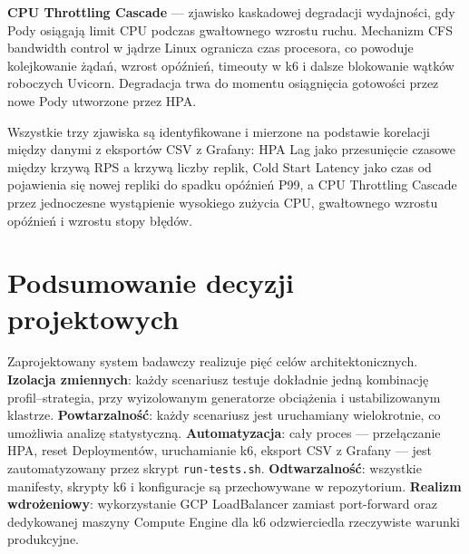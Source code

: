 \textbf{CPU Throttling Cascade} --- zjawisko kaskadowej degradacji wydajności, gdy Pody osiągają limit CPU podczas gwałtownego wzrostu ruchu. Mechanizm CFS bandwidth control w jądrze Linux ogranicza czas procesora, co powoduje kolejkowanie żądań, wzrost opóźnień, timeouty w k6 i dalsze blokowanie wątków roboczych Uvicorn. Degradacja trwa do momentu osiągnięcia gotowości przez nowe Pody utworzone przez HPA.

Wszystkie trzy zjawiska są identyfikowane i mierzone na podstawie korelacji między danymi z eksportów CSV z Grafany: HPA Lag jako przesunięcie czasowe między krzywą RPS a krzywą liczby replik, Cold Start Latency jako czas od pojawienia się nowej repliki do spadku opóźnień P99, a CPU Throttling Cascade przez jednoczesne wystąpienie wysokiego zużycia CPU, gwałtownego wzrostu opóźnień i wzrostu stopy błędów.

\section{Podsumowanie decyzji projektowych}

Zaprojektowany system badawczy realizuje pięć celów architektonicznych. \textbf{Izolacja zmiennych}: każdy scenariusz testuje dokładnie jedną kombinację profil--strategia, przy wyizolowanym generatorze obciążenia i ustabilizowanym klastrze. \textbf{Powtarzalność}: każdy scenariusz jest uruchamiany wielokrotnie, co umożliwia analizę statystyczną. \textbf{Automatyzacja}: cały proces --- przełączanie HPA, reset Deploymentów, uruchamianie k6, eksport CSV z Grafany --- jest zautomatyzowany przez skrypt \texttt{run-tests.sh}. \textbf{Odtwarzalność}: wszystkie manifesty, skrypty k6 i konfiguracje są przechowywane w repozytorium. \textbf{Realizm wdrożeniowy}: wykorzystanie GCP LoadBalancer zamiast port-forward oraz dedykowanej maszyny Compute Engine dla k6 odzwierciedla rzeczywiste warunki produkcyjne.
